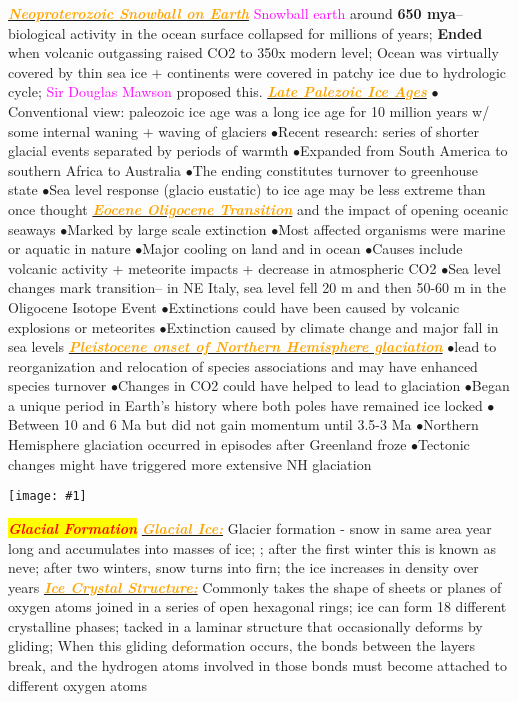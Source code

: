 \documentclass{article}
\newcommand{\ddd}{$\bullet$}
\newcommand{\red}[1]{\textcolor{red}{#1}}
\newcommand{\pink}[1]{\textcolor{magenta}{#1}}
\newcommand{\orange}[1]{\textcolor{orange}{#1}}
\newcommand{\mysection}[1]{\colorbox{yellow}{\textbf{\textit{\red{#1}}}}}
\newcommand{\mysub}[1]{\underline{\textbf{{\textit{\orange{#1}}}}}}
\newcommand{\vocab}[1]{{\pink{#1}}}
\newcommand{\fig}[1]{
	\texttt{[image: \#1]}
}
\begin{document}
\begin{multicols*}{4}
    
        \mysub{Neoproterozoic Snowball on Earth} 
            \vocab{Snowball earth} around \textbf{650 mya}--biological activity in the ocean surface collapsed for millions of years; \textbf{Ended} when volcanic outgassing raised CO2 to 350x modern level; Ocean was virtually covered by thin sea ice + continents were covered in patchy ice due to hydrologic cycle; \vocab{Sir Douglas Mawson} proposed this. 
        \mysub{Late Palezoic Ice Ages}
            \ddd Conventional view: paleozoic ice age was a long ice age for 10 million years w/ some internal waning + waving of glaciers
            \ddd Recent research: series of shorter glacial events separated by periods of warmth
            \ddd Expanded from South America to southern Africa to Australia 
            \ddd The ending constitutes turnover to greenhouse state
            \ddd Sea level response (glacio eustatic) to ice age may be less extreme than once thought
        \mysub{Eocene Oligocene Transition} and the impact of opening oceanic seaways
            \ddd Marked by large scale extinction
            \ddd Most affected organisms were marine or aquatic in nature
            \ddd Major cooling on land and in ocean
            \ddd Causes include volcanic activity + meteorite impacts + decrease in atmospheric CO2
            \ddd Sea level changes mark transition-- in NE Italy, sea level fell 20 m and then 50-60 m in the Oligocene Isotope Event
            \ddd Extinctions could have been caused by volcanic explosions or meteorites
            \ddd Extinction caused by climate change and major fall in sea levels
        \mysub{Pleistocene onset of Northern Hemisphere glaciation}
            \ddd lead to reorganization and relocation of species associations and may have enhanced species turnover
            \ddd Changes in CO2 could have helped to lead to glaciation
            \ddd Began a unique period in Earth’s history where both poles have remained ice locked
            \ddd Between 10 and 6 Ma but did not gain momentum until 3.5-3 Ma
            \ddd Northern Hemisphere glaciation occurred in episodes after Greenland froze
            \ddd Tectonic changes might have triggered more extensive NH glaciation
        \fig{ice_ages1}
		\mysection{Glacial Formation} %
		\mysub {Glacial Ice:}
		Glacier formation - snow in same area year long and accumulates into masses of ice; ; after the first winter this is known as neve; after two winters, snow turns into firn; the ice increases in density over years
		\mysub{Ice Crystal Structure:} 
		Commonly takes the shape of sheets or planes of oxygen atoms joined in a series of open hexagonal rings; ice can form 18 different crystalline phases; tacked in a laminar structure that occasionally deforms by gliding; When this gliding deformation occurs, the bonds between the layers break, and the hydrogen atoms involved in those bonds must become attached to different oxygen atoms

\end{multicols*}
\end{document}
